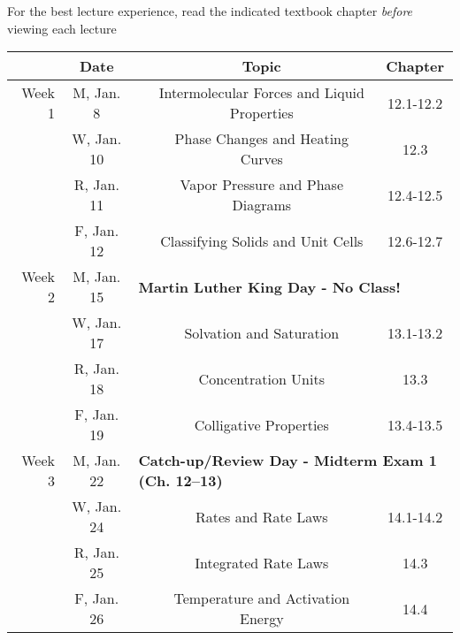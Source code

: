 \documentclass[12pt, letterpaper]{article}
\begin{document}
\noindent For the best lecture experience, read the indicated textbook chapter \emph{before} viewing each lecture

\begin{tabular}{rcccc}
& Date && Topic & Chapter\\
\midrule
Week 1 & M, Jan. 8&& Intermolecular Forces and Liquid Properties & 12.1-12.2\\
& W, Jan. 10&& Phase Changes and Heating Curves & 12.3\\
& R, Jan. 11&& Vapor Pressure and Phase Diagrams & 12.4-12.5\\
& F, Jan. 12&& Classifying Solids and Unit Cells & 12.6-12.7\\
\midrule
Week 2 & M, Jan. 15& \multicolumn{3}{l}{\textbf{Martin Luther King Day - No Class!}}\\
& W, Jan. 17&& Solvation and Saturation & 13.1-13.2\\
& R, Jan. 18&& Concentration Units & 13.3\\
& F, Jan. 19&& Colligative Properties & 13.4-13.5\\
\midrule
Week 3 & M, Jan. 22& \multicolumn{3}{l}{\textbf{Catch-up/Review Day - Midterm Exam 1 (Ch. 12--13)}}\\
& W, Jan. 24&& Rates and Rate Laws & 14.1-14.2\\
& R, Jan. 25&& Integrated Rate Laws & 14.3\\
& F, Jan. 26&& Temperature and Activation Energy & 14.4\\
\end{tabular}
\end{document}
